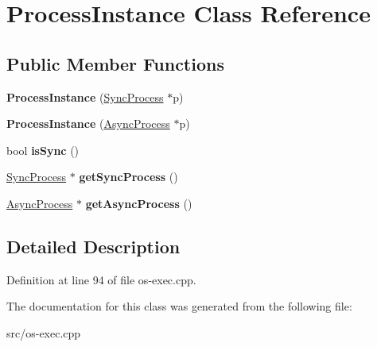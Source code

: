 \hypertarget{class_process_instance}{}\section{Process\+Instance Class Reference}
\label{class_process_instance}
\subsection*{Public Member Functions}
\begin{DoxyCompactItemize}
\item 
{\bfseries Process\+Instance} (\hyperlink{class_sync_process}{Sync\+Process} $\ast$p)\hypertarget{class_process_instance_a5c44f7af40e70c482d4936bf0b4e0f96}{}\label{class_process_instance_a5c44f7af40e70c482d4936bf0b4e0f96}

\item 
{\bfseries Process\+Instance} (\hyperlink{class_async_process}{Async\+Process} $\ast$p)\hypertarget{class_process_instance_a8ec9624e22c3fd19f08420a1b1ee05e8}{}\label{class_process_instance_a8ec9624e22c3fd19f08420a1b1ee05e8}

\item 
bool {\bfseries is\+Sync} ()\hypertarget{class_process_instance_a98cf0e02baac4033c18060979414e148}{}\label{class_process_instance_a98cf0e02baac4033c18060979414e148}

\item 
\hyperlink{class_sync_process}{Sync\+Process} $\ast$ {\bfseries get\+Sync\+Process} ()\hypertarget{class_process_instance_adb02ed537f00f0bd5166a0b44bb8fe9c}{}\label{class_process_instance_adb02ed537f00f0bd5166a0b44bb8fe9c}

\item 
\hyperlink{class_async_process}{Async\+Process} $\ast$ {\bfseries get\+Async\+Process} ()\hypertarget{class_process_instance_af22bdd85f42f0ccda888aa2613d329c5}{}\label{class_process_instance_af22bdd85f42f0ccda888aa2613d329c5}

\end{DoxyCompactItemize}


\subsection{Detailed Description}


Definition at line 94 of file os-\/exec.\+cpp.



The documentation for this class was generated from the following file\+:\begin{DoxyCompactItemize}
\item 
src/os-\/exec.\+cpp\end{DoxyCompactItemize}
